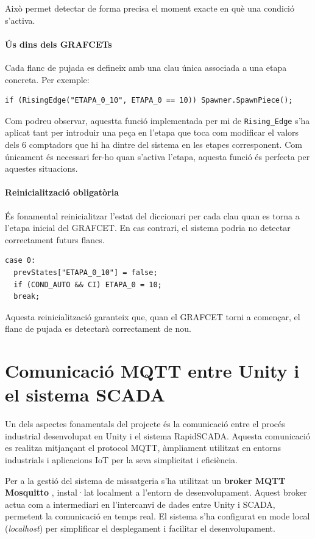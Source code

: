 \documentclass[a4paper,11pt,DIV=13,headings=normal,abstract=true,twoside=semi]{article}
\begin{document}
Això permet detectar de forma precisa el moment exacte en què una condició s'activa.

\paragraph{Ús dins dels GRAFCETs}

Cada flanc de pujada es defineix amb una clau única associada a una etapa concreta. Per exemple:

\begin{lstlisting}[style=simple]
if (RisingEdge("ETAPA_0_10", ETAPA_0 == 10)) Spawner.SpawnPiece();
\end{lstlisting}


Com podreu observar, aquestta funció implementada per mi de \texttt{Rising\_Edge} s'ha aplicat tant per introduir una peça en l'etapa que toca com modificar el valors dels 6 comptadors que hi ha dintre del sistema en les etapes corresponent. Com únicament és necessari fer-ho quan s'activa l'etapa, aquesta funció és perfecta per aquestes situacions.

\paragraph{Reinicialització obligatòria}

És fonamental reinicialitzar l'estat del diccionari per cada clau quan es torna a l'etapa inicial del GRAFCET. En cas contrari, el sistema podria no detectar correctament futurs flancs.

\begin{lstlisting}[style=simple ]
case 0:
  prevStates["ETAPA_0_10"] = false;
  if (COND_AUTO && CI) ETAPA_0 = 10;
  break;
\end{lstlisting}

Aquesta reinicialització garanteix que, quan el GRAFCET torni a començar, el flanc de pujada es detectarà correctament de nou.
\newpage
\section{Comunicació MQTT entre Unity i el sistema SCADA}

Un dels aspectes fonamentals del projecte és la comunicació entre el procés industrial desenvolupat en Unity i el sistema RapidSCADA. Aquesta comunicació es realitza mitjançant el protocol MQTT, àmpliament utilitzat en entorns industrials i aplicacions IoT per la seva simplicitat i eficiència.

Per a la gestió del sistema de missatgeria s'ha utilitzat un \textbf{broker MQTT Mosquitto} \cite{mosquitto_download}, instal·lat localment a l'entorn de desenvolupament. Aquest broker actua com a intermediari en l'intercanvi de dades entre Unity i SCADA, permetent la comunicació en temps real. El sistema s'ha configurat en mode local (\textit{localhost}) per simplificar el desplegament i facilitar el desenvolupament.
\end{document}
